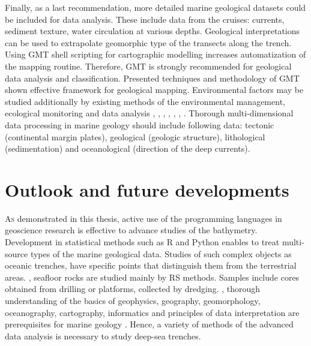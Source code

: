 \documentclass[11pt,a4paper]{report}
\begin{document}
{Finally, as a last recommendation, more detailed marine geological datasets could be included for data analysis. These include data from the cruises: currents, sediment texture, water circulation at various depths. Geological interpretations can be used to extrapolate geomorphic type of the transects along the trench. Using \ac{GMT} shell scripting for cartographic modelling increases automatization of the mapping routine. Therefore, \ac{GMT} is strongly recommended for geological data analysis and classification. Presented techniques and methodology of \ac{GMT} shown effective framework for geological mapping. Environmental factors may be studied additionally by existing methods of the environmental management, ecological monitoring and data analysis \cite{Lemenkova2014g}, \cite{Lemenkova201529}, \cite{Lemenkova201533}, \cite{Lemenkova201534},   \cite{Lemenkova201555}, \cite{Lemenkova201559}, \cite{Lemenkova201560}. Thorough multi-dimensional data processing in marine geology should include following data: tectonic (continental margin plates), geological (geologic structure), lithological (sedimentation) and oceanological (direction of the deep currents). 

\pagebreak
\section{Outlook and future developments}\label{sec:10} 
\lettrine[lines=3]{\color{MediumPurple4}A}{s} demonstrated in this thesis, active use of the programming languages in geoscience research is effective to advance studies of the bathymetry. Development in statistical methods such as R and Python enables to treat multi-source types of the marine geological data. Studies of such complex objects as oceanic trenches, have specific points that distinguish them from the terrestrial areas. , seafloor rocks are studied mainly by \ac{RS} methods. Samples include cores obtained from drilling or platforms, collected by dredging. , thorough understanding of the basics of geophysics, geography, geomorphology, oceanography, cartography, informatics and principles of data interpretation are prerequisites for marine geology \cite{Lemenkova202109}. Hence, a variety of methods of the advanced data analysis is necessary to study deep-sea trenches. 

}
\end{document}
